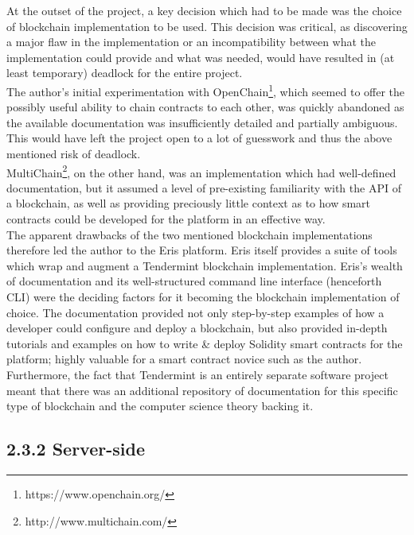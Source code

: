 \documentclass[12pt]{report}
\begin{document}
At the outset of the project, a key decision which had to be made was
the choice of blockchain implementation to be used. This decision was
critical, as discovering a major flaw in the implementation or an
incompatibility between what the implementation could provide and what
was needed, would have resulted in (at least temporary) deadlock for the
entire project.\\
The author's initial experimentation with
OpenChain\footnote{https://www.openchain.org/}, which seemed to
offer the possibly useful ability to chain contracts to each other, was
quickly abandoned as the available documentation was insufficiently
detailed and partially ambiguous. This would have left the project open
to a lot of guesswork and thus the above mentioned risk of deadlock.\\
MultiChain\footnote{http://www.multichain.com/}, on the other
hand, was an implementation which had well-defined documentation, but it
assumed a level of pre-existing familiarity with the API of a
blockchain, as well as providing preciously little context as to how
smart contracts could be developed for the platform in an effective
way.\\
The apparent drawbacks of the two mentioned blockchain implementations
therefore led the author to the
Eris\cite{1erisindustries} platform. Eris itself
provides a suite of tools which wrap and augment a
Tendermint\cite{1tendermint} blockchain
implementation. Eris's wealth of documentation and its well-structured
command line interface (henceforth CLI) were the deciding factors for it
becoming the blockchain implementation of choice. The documentation
provided not only step-by-step examples of how a developer could
configure and deploy a blockchain, but also provided in-depth tutorials
and examples on how to write \& deploy
Solidity\cite{1solidity}
smart contracts for the platform; highly valuable for a smart contract
novice such as the author. Furthermore, the fact that Tendermint is an
entirely separate software project meant that there was an additional
repository of documentation for this specific type of blockchain and the
computer science theory backing it.

\subsection{2.3.2 Server-side}\label{server-side}
\end{document}
